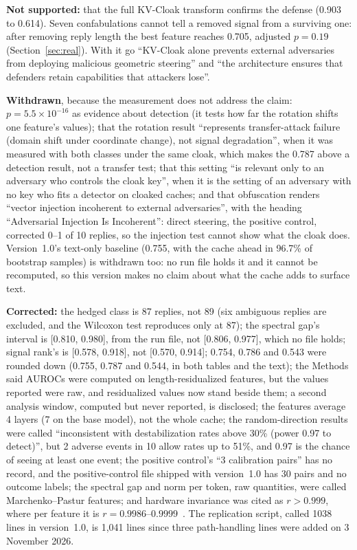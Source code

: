 \documentclass[11pt,a4paper]{article}
\begin{document}
\textbf{Not supported:} that the full KV-Cloak transform confirms the
defense (0.903 to 0.614). Seven confabulations cannot tell a removed
signal from a surviving one: after removing reply length the best feature
reaches 0.705, adjusted $p = 0.19$ (Section~\ref{sec:real}). With it go
``KV-Cloak alone prevents external adversaries from deploying malicious
geometric steering'' and ``the architecture ensures that defenders retain
capabilities that attackers lose''.

\textbf{Withdrawn}, because the measurement does not address the claim:
$p = 5.5 \times 10^{-16}$ as evidence about detection (it tests how far
the rotation shifts one feature's values); that the
rotation result ``represents transfer-attack failure (domain shift under
coordinate change), not signal degradation'', when it was measured with
both classes under the same cloak, which makes the 0.787 above a
detection result, not a transfer test; that this setting ``is relevant only to
an adversary who controls the cloak key'', when it is the setting of an
adversary with no key who fits a detector on cloaked caches; and that
obfuscation renders ``vector injection incoherent to external
adversaries'', with the heading ``Adversarial Injection Is Incoherent'':
direct steering, the positive control, corrected 0--1 of 10 replies, so
the injection test cannot show what the cloak does. Version~1.0's
text-only baseline (0.755, with the cache ahead in 96.7\% of bootstrap
samples) is withdrawn too: no run file holds it and it cannot be
recomputed, so this version makes no claim about what the cache adds to
surface text.

\textbf{Corrected:} the hedged class is 87 replies, not 89 (six ambiguous
replies are excluded, and the Wilcoxon test reproduces only at 87); the
spectral gap's interval is [0.810, 0.980], from the run file, not [0.806,
0.977], which no file holds; signal rank's is [0.578, 0.918], not [0.570,
0.914]; 0.754, 0.786 and 0.543 were rounded down (0.755, 0.787 and 0.544,
in both tables and the text); the Methods said AUROCs were computed on
length-residualized features, but the values reported were raw, and
residualized values now stand beside them; a second analysis window,
computed but never reported, is disclosed; the features average 4 layers
(7 on the base model), not the whole cache; the random-direction results
were called ``inconsistent with destabilization rates above 30\% (power
0.97 to detect)'', but 2 adverse events in 10 allow rates up to 51\%, and
0.97 is the chance of seeing at least one event; the positive control's
``3 calibration pairs'' has no record, and the positive-control file
shipped with version~1.0 has 30 pairs and no outcome labels; the spectral
gap and norm per token, raw quantities, were called Marchenko--Pastur
features; and hardware invariance was cited as $r > 0.999$, where per
feature it is $r = 0.9986$--$0.9999$~\citep{lyra2026techniqueii}. The
replication script, called 1038 lines in version~1.0, is 1,041 lines
since three path-handling lines were added on 3 November 2026.
\end{document}
